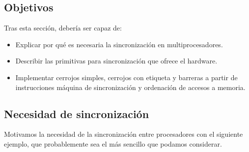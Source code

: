 \subsection{Objetivos}
Tras esta sección, debería ser capaz de:
\begin{itemize}
    \item Explicar por qué es necesaria la sincronización en multiprocesadores.
    \item Describir las primitivas para sincronización que ofrece el hardware.
    \item Implementar cerrojos simples, cerrojos con etiqueta y barreras a partir de instrucciones máquina de sincronización y ordenación de accesos a memoria.
\end{itemize}

\subsection{Necesidad de sincronización}
Motivamos la necesidad de la sincronización entre procesadores con el siguiente ejemplo, que probablemente sea el más sencillo que podamos considerar.

